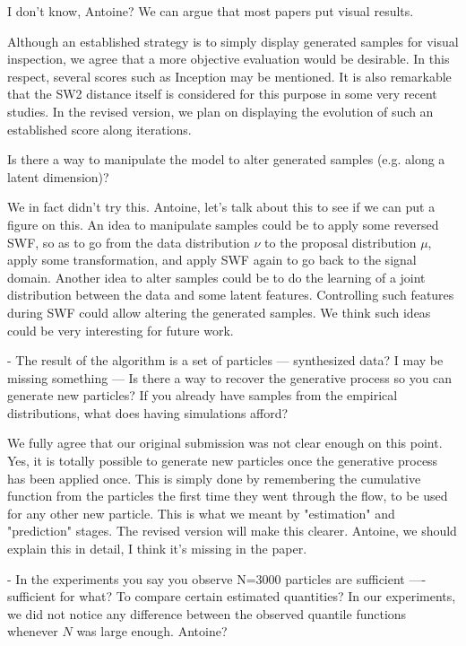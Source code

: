 \documentclass{article}
\newcommand{\rev}[1]{{\color{red} #1}}
\newcommand{\umut}[1]{{\color{blue} #1}}
\newcommand{\antoine}[1]{{\color{orange} #1}}
\begin{document}
\umut{I don't know, Antoine? We can argue that most papers put visual results.}

\antoine{Although an established strategy is to simply display generated samples for visual inspection, we agree that a more objective evaluation would be desirable. In this respect, several scores such as Inception may be mentioned. It is also remarkable that the SW2 distance itself is considered for this purpose in some very recent studies. In the revised version, we plan on displaying the evolution of such an established score along iterations.}

\rev{Is there a way to manipulate the model to alter generated samples (e.g. along a latent dimension)?}

\umut{We in fact didn't try this. Antoine, let's talk about this to see if we can put a figure on this.}
\antoine{An idea to manipulate samples could be to apply some reversed SWF, so as to go from the data distribution $\nu$ to the proposal distribution $\mu$, apply some transformation, and apply SWF again to go back to the signal domain. Another idea to alter samples could be to do the learning of a joint distribution between the data and some latent features. Controlling such features during SWF could allow altering the generated samples. We think such ideas could be very interesting for future work.}

\rev{- The result of the algorithm is a set of particles — synthesized data? I may be missing something — Is there a way to recover the generative process so you can generate new particles? If you already have samples from the empirical distributions, what does having simulations afford?}

\antoine{We fully agree that our original submission was not clear enough on this point. Yes, it is totally possible to generate new particles once the generative process has been applied once. This is simply done by remembering the cumulative function from the particles the first time they went through the flow, to be used for any other new particle. This is what we meant by "estimation" and "prediction" stages. The revised version will make this clearer.}
\umut{Antoine, we should explain this in detail, I think it's missing in the paper.}

\rev{- In the experiments you say you observe N=3000 particles are sufficient —- sufficient for what? To compare certain estimated quantities?}
\antoine{In our experiments, we did not notice any difference between the observed quantile functions whenever $N$ was large enough.}
\umut{Antoine?}
\end{document}
